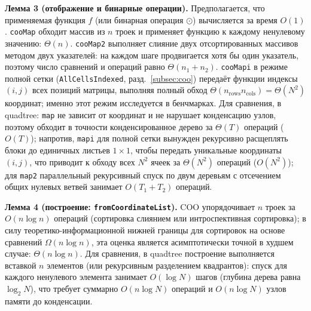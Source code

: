 \documentclass[a4paper]{article}
\begin{document}
\textbf{Лемма 3 (отображение и бинарные операции).}
Предполагается, что применяемая функция $f$ (или бинарная операция $\odot$) вычисляется за время $O(1)$.
\texttt{cooMap} обходит массив из $n$ троек и применяет функцию к каждому ненулевому значению: $\Theta(n)$.
\texttt{cooMap2} выполняет слияние двух отсортированных массивов методом двух указателей: на каждом шаге продвигается хотя бы один указатель, поэтому число сравнений и операций равно $\Theta(n_1+n_2)$.
\texttt{cooMapi} в режиме полной сетки (\texttt{AllCellsIndexed}, разд.~\ref{subsec:coo}) передаёт функции индексы $(i,j)$ всех позиций матрицы, выполняя полный обход $\Theta(n_{\mathrm{rows}}n_{\mathrm{cols}}) = \Theta(N^2)$ координат; именно этот режим исследуется в бенчмарках.
Для сравнения, в quadtree: \texttt{map} не зависит от координат и не нарушает конденсацию узлов, поэтому обходит в точности конденсированное дерево за $\Theta(T)$ операций ($O(T)$); напротив, \texttt{mapi} для полной сетки вынужден рекурсивно расщеплять блоки до единичных листьев $1\times 1$, чтобы передать уникальные координаты $(i,j)$, что приводит к обходу всех $N^2$ ячеек за $\Theta(N^2)$ операций ($O(N^2)$); для \texttt{map2} параллельный рекурсивный спуск по двум деревьям с отсечением общих нулевых ветвей занимает $O(T_1+T_2)$ операций.

\textbf{Лемма 4 (построение: \texttt{fromCoordinateList}).}
COO упорядочивает $n$ троек за $O(n\log n)$ операций (сортировка слиянием или интроспективная сортировка); в силу теоретико-информационной нижней границы для сортировок на основе сравнений $\Omega(n \log n)$, эта оценка является асимптотически точной в худшем случае: $\Theta(n \log n)$. Для сравнения, в quadtree построение выполняется вставкой $n$ элементов (или рекурсивным разделением квадрантов): спуск для каждого ненулевого элемента занимает $O(\log N)$ шагов (глубина дерева равна $\log_2 N$), что требует суммарно $O(n\log N)$ операций и $O(n\log N)$ узлов памяти до конденсации.
\end{document}
